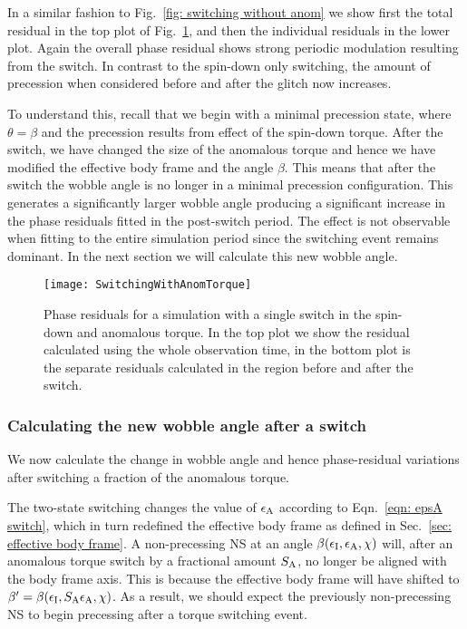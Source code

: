 \documentclass[../full_thesis/full_thesis.tex]{subfiles}
\begin{document}
In a similar fashion to Fig.~\ref{fig: switching without anom} we show first
the total residual in the top plot of Fig.~\ref{fig: switching with anom}, and
then the individual residuals in the lower plot. Again the overall phase residual
shows strong periodic modulation resulting from the switch. In contrast to the
spin-down only switching, the amount of precession when considered before and
after the glitch now increases.

To understand this, recall that we begin with a minimal precession state, where
$\theta = \beta$ and the precession results from effect of the spin-down
torque.  After the switch, we have changed the size of the anomalous torque and
hence we have modified the effective body frame and the angle $\beta$. This
means that after the switch the wobble angle is no longer in a minimal
precession configuration.
This generates a significantly larger wobble angle producing a significant
increase in the phase residuals fitted in the post-switch period. The effect is
not observable when fitting to the entire simulation period since the switching
event remains dominant. In the next section we will calculate this new wobble
angle.

\begin{figure}[htb]
\texttt{[image: SwitchingWithAnomTorque]} \caption{Phase
residuals for a simulation with a single switch in the spin-down and anomalous
torque. In the top plot we show the residual calculated using the whole
observation time, in the bottom plot is the separate residuals calculated in
the region before and after the switch.}
\label{fig: switching with anom}
\end{figure}

\subsubsection{Calculating the new wobble angle after a switch}
We now calculate the change in wobble angle and hence phase-residual variations
after switching a fraction of the anomalous torque.

The two-state switching changes the value of $\epsilon_{\mathrm{A}}$ according to
Eqn.~\eqref{eqn: epsA switch}, which in turn redefined the effective body frame
as defined in Sec.~\ref{sec: effective body frame}. A non-precessing NS at an
angle $\beta(\epsilon_{\mathrm{I}}, \epsilon_{\mathrm{A}}, \chi)$ will, after an anomalous torque switch by a fractional
amount $S_{\mathrm{A}}$, no longer be aligned with the body frame axis. This is
because the effective body frame will have shifted to $\beta' = \beta(\epsilon_{\mathrm{I}},
S_{\mathrm{A}}\epsilon_{\mathrm{A}}, \chi)$. As a result, we should expect the previously
non-precessing NS to begin precessing after a torque switching event.
\end{document}
